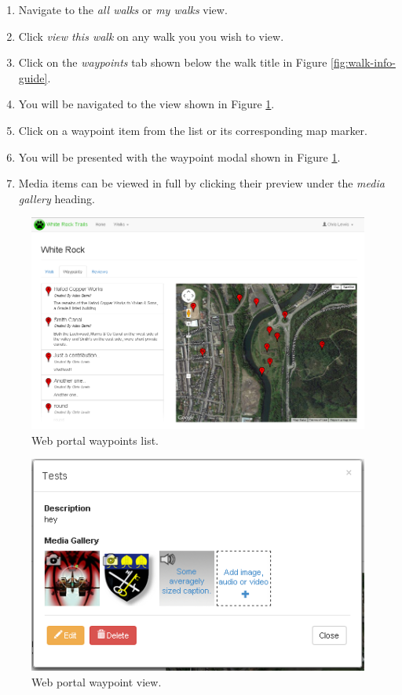 \documentclass[11pt,a4paper]{report}
\begin{document}
\begin{enumerate}
\item Navigate to the \emph{all walks} or \emph{my walks} view.
\item Click \emph{view this walk} on any walk you you wish to view.
\item Click on the \emph{waypoints} tab shown below the walk title in Figure \ref{fig:walk-info-guide}.
\item You will be navigated to the view shown in Figure \ref{fig:walk-waypoints-guide}.
\item Click on a waypoint item from the list or its corresponding map marker.
\item You will be presented with the waypoint modal shown in Figure \ref{fig:walk-waypoints-guide}.
\item Media items can be viewed in full by clicking their preview under the \emph{media gallery} heading.
\end{enumerate}

\begin{figure}[H]
\centering
\includegraphics[width=0.8\linewidth]{./img/webportal/walk-waypoints}
\caption{Web portal waypoints list.}
\label{fig:walk-waypoints-guide}
\end{figure}

\begin{figure}[H]
\centering
\includegraphics[width=0.7\linewidth]{./img/webportal/waypoint}
\caption{Web portal waypoint view.}
\label{fig:waypoint-guide}
\end{figure}
\end{document}
